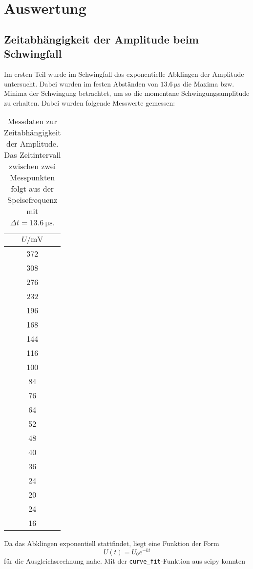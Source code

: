 \section{Auswertung}
\label{sec:Auswertung}

\subsection{Zeitabhängigkeit der Amplitude beim Schwingfall}
\label{sec:Zeitabhängigkeit der Amplitude beim Schwingfall}
Im ersten Teil wurde im Schwingfall das exponentielle Abklingen der Amplitude untersucht. 
Dabei wurden im festen Abständen von $\SI{13.6}{\micro\second}$
die Maxima bzw. Minima der Schwingung betrachtet, um so die momentane Schwingungsamplitude
zu erhalten. Dabei wurden folgende Messwerte gemessen:
\begin{table}[H]
	\centering
	\caption{Messdaten zur Zeitabhängigkeit der Amplitude. Das Zeitintervall zwischen
		zwei Messpunkten folgt aus der Speisefrequenz mit $\Delta t =
	\SI{13.6}{\micro\second}$.}
	\label{tab:Messwerte-5a}
	\begin{tabular}{c}
		\toprule
		$U / \si{\milli\volt}$\\
		\midrule
		372	\\
		308	\\
		276	\\
		232	\\
		196	\\
		168	\\
		144	\\
		116	\\
		100	\\
		84 	\\
		76 	\\
		64 	\\
		52 	\\
		48 	\\
		40 	\\
		36 	\\
		24 	\\
		20 	\\
		24 	\\
		16 	\\
		\bottomrule
	\end{tabular}
\end{table}
Da das Abklingen exponentiell stattfindet, liegt eine Funktion der Form
\begin{equation}
	U(t) = U_0 e^{-kt}
\end{equation}
für die Ausgleichsrechnung nahe. Mit der \texttt{curve\_fit}-Funktion aus scipy konnten
